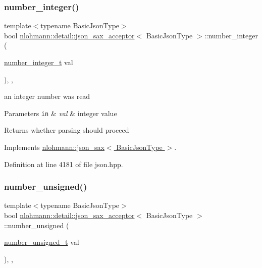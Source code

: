 \subsubsection{\texorpdfstring{number\+\_\+integer()}{number\_integer()}}
{\footnotesize\ttfamily template$<$typename Basic\+Json\+Type$>$ \\
bool \hyperlink{classnlohmann_1_1detail_1_1json__sax__acceptor}{nlohmann\+::detail\+::json\+\_\+sax\+\_\+acceptor}$<$ Basic\+Json\+Type $>$\+::number\+\_\+integer (\begin{DoxyParamCaption}\item[{\hyperlink{structnlohmann_1_1json__sax_a0cef30121f02b7fee85e9708148ea0aa}{number\+\_\+integer\+\_\+t}}]{val }\end{DoxyParamCaption})\hspace{0.3cm}{\ttfamily [inline]}, {\ttfamily [override]}, {\ttfamily [virtual]}}



an integer number was read 


\begin{DoxyParams}[1]{Parameters}
\mbox{\tt in}  & {\em val} & integer value \\
\hline
\end{DoxyParams}
\begin{DoxyReturn}{Returns}
whether parsing should proceed 
\end{DoxyReturn}


Implements \hyperlink{structnlohmann_1_1json__sax_affa7a78b8e9cc9cc3ac99927143142a5}{nlohmann\+::json\+\_\+sax$<$ Basic\+Json\+Type $>$}.



Definition at line 4181 of file json.\+hpp.

\mbox{\label{classnlohmann_1_1detail_1_1json__sax__acceptor_a0759eb1ea812c4cfdf42065dd7f4c71b}} 
\subsubsection{\texorpdfstring{number\+\_\+unsigned()}{number\_unsigned()}}
{\footnotesize\ttfamily template$<$typename Basic\+Json\+Type$>$ \\
bool \hyperlink{classnlohmann_1_1detail_1_1json__sax__acceptor}{nlohmann\+::detail\+::json\+\_\+sax\+\_\+acceptor}$<$ Basic\+Json\+Type $>$\+::number\+\_\+unsigned (\begin{DoxyParamCaption}\item[{\hyperlink{structnlohmann_1_1json__sax_a32028cc056ae0f43aaae331cdbbbf856}{number\+\_\+unsigned\+\_\+t}}]{val }\end{DoxyParamCaption})\hspace{0.3cm}{\ttfamily [inline]}, {\ttfamily [override]}, {\ttfamily [virtual]}}



